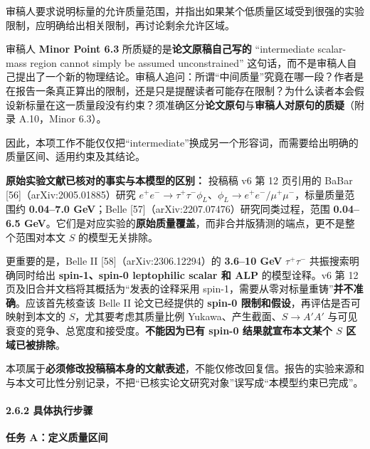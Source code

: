 \documentclass[
  chinese,
  UTF8]{ctexart}
\begin{document}
审稿人要求说明标量的允许质量范围，并指出如果某个低质量区域受到很强的实验限制，应明确给出相关限制，再讨论剩余允许区域。

审稿人 \textbf{Minor Point 6.3} 所质疑的是\textbf{论文原稿自己写的}
``intermediate scalar-mass region cannot simply be assumed
unconstrained''
这句话，而不是审稿人自己提出了一个新的物理结论。审稿人追问：所谓``中间质量''究竟在哪一段？作者是在报告一条真正算出的限制，还是只是提醒读者可能存在限制？为什么读者本会假设新标量在这一质量段没有约束？须准确区分\textbf{论文原句}与\textbf{审稿人对原句的质疑}（附录
A.10，Minor 6.3）。

因此，本项工作不能仅仅把``intermediate''换成另一个形容词，而需要给出明确的质量区间、适用约束及其结论。

\textbf{原始实验文献已核对的事实与本模型的区别：} 投稿稿 v6 第 12
页引用的 BaBar {[}56{]}（arXiv:2005.01885）研究
\(e^+e^-\to\tau^+\tau^-\phi_L\)、\(\phi_L\to e^+e^-/\mu^+\mu^-\)，标量质量范围约
\textbf{0.04--7.0 GeV}；Belle
{[}57{]}（arXiv:2207.07476）研究同类过程，范围 \textbf{0.04--6.5
GeV}。它们是对应实验的\textbf{原始质量覆盖}，而非合并版猜测的端点，更不是整个范围对本文
\(S\) 的模型无关排除。

更重要的是，Belle II {[}58{]}（arXiv:2306.12294）的 \textbf{3.6--10 GeV}
\(\tau^+\tau^-\) 共振搜索明确同时给出 \textbf{spin-1、spin-0 leptophilic
scalar 和 ALP} 的模型诠释。v6 第 12
页及旧合并文档将其概括为``发表的诠释采用
spin-1，需要从零对标量重铸''\textbf{并不准确}。应该首先核查该 Belle II
论文已经提供的 \textbf{spin-0 限制和假设}，再评估是否可映射到本文的
\(S\)，尤其要考虑其质量比例 Yukawa、产生截面、\(S\to A'A'\)
与可见衰变的竞争、总宽度和接受度。\textbf{不能因为已有 spin-0
结果就宣布本文某个 \(S\) 区域已被排除}。

本项属于\textbf{必须修改投稿稿本身的文献表述}，不能仅修改回复信。报告的实验来源和与本文可比性分别记录，不把``已核实论文研究对象''误写成``本模型约束已完成''。

\paragraph{2.6.2
具体执行步骤}\label{ux5177ux4f53ux6267ux884cux6b65ux9aa4}

\textbf{任务 A：定义质量区间}
\end{document}
